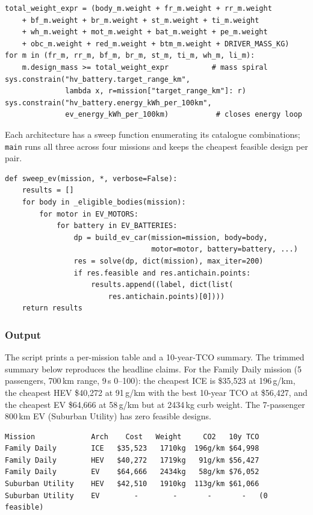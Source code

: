 \documentclass[11pt,a4paper]{article}
\begin{document}
\begin{lstlisting}
total_weight_expr = (body_m.weight + fr_m.weight + rr_m.weight
    + bf_m.weight + br_m.weight + st_m.weight + ti_m.weight
    + wh_m.weight + mot_m.weight + bat_m.weight + pe_m.weight
    + obc_m.weight + red_m.weight + btm_m.weight + DRIVER_MASS_KG)
for m in (fr_m, rr_m, bf_m, br_m, st_m, ti_m, wh_m, li_m):
    m.design_mass >= total_weight_expr          # mass spiral
sys.constrain("hv_battery.target_range_km",
              lambda x, r=mission["target_range_km"]: r)
sys.constrain("hv_battery.energy_kWh_per_100km",
              ev_energy_kWh_per_100km)           # closes energy loop
\end{lstlisting}

Each architecture has a sweep function enumerating its catalogue
combinations; \texttt{main} runs all three across four missions and
keeps the cheapest feasible design per pair.

\begin{lstlisting}
def sweep_ev(mission, *, verbose=False):
    results = []
    for body in _eligible_bodies(mission):
        for motor in EV_MOTORS:
            for battery in EV_BATTERIES:
                dp = build_ev_car(mission=mission, body=body,
                                  motor=motor, battery=battery, ...)
                res = solve(dp, dict(mission), max_iter=200)
                if res.feasible and res.antichain.points:
                    results.append((label, dict(list(
                        res.antichain.points)[0])))
    return results
\end{lstlisting}

\subsubsection*{Output}

The script prints a per-mission table and a 10-year-TCO summary. The
trimmed summary below reproduces the headline claims. For the Family
Daily mission (5 passengers, 700\,km range, 9\,s 0--100): the cheapest
ICE is \$35{,}523 at 196\,g/km, the cheapest HEV \$40{,}272 at 91\,g/km
with the best 10-year TCO at \$56{,}427, and the cheapest EV \$64{,}666
at 58\,g/km but at 2434\,kg curb weight. The 7-passenger 800\,km EV
(Suburban Utility) has zero feasible designs.

\begin{lstlisting}[language={},numbers=none,keywordstyle={}]
Mission             Arch    Cost   Weight     CO2   10y TCO
Family Daily        ICE   $35,523   1710kg  196g/km $64,998
Family Daily        HEV   $40,272   1719kg   91g/km $56,427
Family Daily        EV    $64,666   2434kg   58g/km $76,052
Suburban Utility    HEV   $42,510   1910kg  113g/km $61,066
Suburban Utility    EV        -        -       -       -   (0 feasible)
\end{lstlisting}
\end{document}
